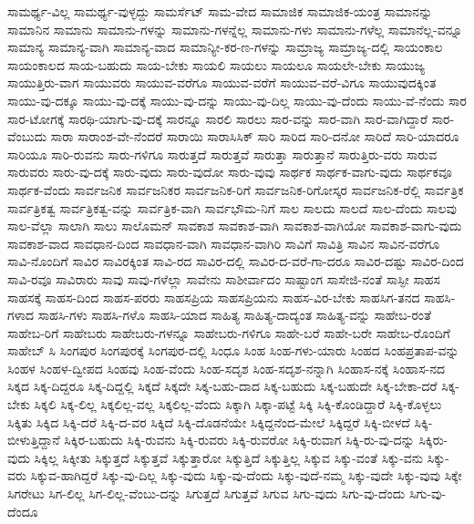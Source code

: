 {ಸಾಮರ್ಥ್ಯ-ವಿಲ್ಲ
ಸಾಮರ್ಥ್ಯ-ವುಳ್ಳದ್ದು
ಸಾಮರ್ಸೆಟ್
ಸಾಮ-ವೇದ
ಸಾಮಾಜಿಕ
ಸಾಮಾಜಿಕ-ಯಂತ್ರ
ಸಾಮಾನನ್ನು
ಸಾಮಾನಿನ
ಸಾಮಾನು
ಸಾಮಾನು-ಗಳನ್ನು
ಸಾಮಾನು-ಗಳನ್ನೆಲ್ಲ
ಸಾಮಾನು-ಗಳು
ಸಾಮಾನು-ಗಳೆಲ್ಲ
ಸಾಮಾನೆಲ್ಲ-ವನ್ನೂ
ಸಾಮಾನ್ಯ
ಸಾಮಾನ್ಯ-ವಾಗಿ
ಸಾಮಾನ್ಯ-ವಾದ
ಸಾಮಾನ್ಯೀ-ಕರ-ಣ-ಗಳನ್ನು
ಸಾಮ್ರಾಜ್ಯ
ಸಾಮ್ರಾಜ್ಯ-ದಲ್ಲಿ
ಸಾಯಂಕಾಲ
ಸಾಯಂಕಾಲದ
ಸಾಯ-ಬಹುದು
ಸಾಯ-ಬೇಕು
ಸಾಯಲಿ
ಸಾಯಲು
ಸಾಯಲೂ
ಸಾಯಲೇ-ಬೇಕು
ಸಾಯುಜ್ಯ
ಸಾಯುತ್ತಿರು-ವಾಗ
ಸಾಯುವರು
ಸಾಯುವ-ವರೆಗೂ
ಸಾಯುವ-ವರೆಗೆ
ಸಾಯುವ-ವರೆ-ವಿಗೂ
ಸಾಯುವುದಕ್ಕಿಂತ
ಸಾಯು-ವು-ದಕ್ಕೂ
ಸಾಯು-ವು-ದಕ್ಕೆ
ಸಾಯು-ವು-ದನ್ನು
ಸಾಯು-ವು-ದಿಲ್ಲ
ಸಾಯು-ವು-ದೆಂದು
ಸಾಯು-ವೆ-ನೆಂದು
ಸಾರ
ಸಾರ-ಟೋಗಕ್ಕೆ
ಸಾರಥಿ-ಯಾಗು-ವು-ದಕ್ಕೆ
ಸಾರನ್ನೂ
ಸಾರಲಿ
ಸಾರಲು
ಸಾರ-ವನ್ನು
ಸಾರ-ವಾಗಿ
ಸಾರ-ವಾಗಿದ್ದಾರೆ
ಸಾರ-ವೆಂಬುದು
ಸಾರಾ
ಸಾರಾಂಶ-ವೇ-ನೆಂದರೆ
ಸಾರಾಯಿ
ಸಾರಾಸಿಸಿಕ್
ಸಾರಿ
ಸಾರಿದ
ಸಾರಿ-ದನೋ
ಸಾರಿದೆ
ಸಾರಿ-ಯಾದರೂ
ಸಾರಿಯೂ
ಸಾರಿ-ರುವನು
ಸಾರು-ಗಳಿಗೂ
ಸಾರುತ್ತದೆ
ಸಾರುತ್ತವೆ
ಸಾರುತ್ತಾ
ಸಾರುತ್ತಾನೆ
ಸಾರುತ್ತಿರು-ವರು
ಸಾರುವ
ಸಾರುವರು
ಸಾರು-ವು-ದಕ್ಕೆ
ಸಾರು-ವುದು
ಸಾರು-ವುದೋ
ಸಾರು-ವುವು
ಸಾರ್ಥಕ
ಸಾರ್ಥಕ-ವಾಗು-ವುದು
ಸಾರ್ಥಕವೂ
ಸಾರ್ಥಕ-ವೆಂದು
ಸಾರ್ವಜನಿಕ
ಸಾರ್ವಜನಿಕರ
ಸಾರ್ವಜನಿಕ-ರಿಗೆ
ಸಾರ್ವಜನಿಕ-ರಿಗೋಸ್ಕರ
ಸಾರ್ವಜನಿಕ-ರೆಲ್ಲಿ
ಸಾರ್ವತ್ರಿಕ
ಸಾರ್ವತ್ರಿಕತ್ವ
ಸಾರ್ವತ್ರಿಕತ್ವ-ವನ್ನು
ಸಾರ್ವತ್ರಿಕ-ವಾಗಿ
ಸಾರ್ವಭೌಮ-ನಿಗೆ
ಸಾಲ
ಸಾಲದು
ಸಾಲದೆ
ಸಾಲ-ದೆಂದು
ಸಾಲವು
ಸಾಲ-ವೆಲ್ಲಾ
ಸಾಲಾಗಿ
ಸಾಲು
ಸಾಲೊಮನ್
ಸಾವಕಾಶ
ಸಾವಕಾಶ-ವಾಗಿ
ಸಾವಕಾಶ-ವಾಗಿಯೋ
ಸಾವಕಾಶ-ವಾಗು-ವುದು
ಸಾವಕಾಶ-ವಾದ
ಸಾವಧಾನ-ದಿಂದ
ಸಾವಧಾನ-ವಾಗಿ
ಸಾವಧಾನ-ವಾಗಿರಿ
ಸಾವಿಗೆ
ಸಾವಿತ್ರಿ
ಸಾವಿನ
ಸಾವಿನ-ವರೆಗೂ
ಸಾವಿ-ನೊಂದಿಗೆ
ಸಾವಿರ
ಸಾವಿರಕ್ಕಿಂತ
ಸಾವಿ-ರದ
ಸಾವಿರ-ದಲ್ಲಿ
ಸಾವಿರ-ದ-ವರೆ-ಗಾ-ದರೂ
ಸಾವಿರ-ದಷ್ಟು
ಸಾವಿರ-ದಿಂದ
ಸಾವಿ-ರವೂ
ಸಾವಿರಾರು
ಸಾವು
ಸಾವು-ಗಳೆಲ್ಲಾ
ಸಾವೇನು
ಸಾಶೀರ್ವಾದಂ
ಸಾಷ್ಟಾಂಗ
ಸಾಸೇಜಿ-ನಂತೆ
ಸಾಸ್ಫೀ
ಸಾಹಸ
ಸಾಹಸಕ್ಕೆ
ಸಾಹಸ-ದಿಂದ
ಸಾಹಸ-ಪರರು
ಸಾಹಸಪ್ರಿಯ
ಸಾಹಸಪ್ರಿಯನು
ಸಾಹಸ-ವಿರ-ಬೇಕು
ಸಾಹಸಿಗ-ತನದ
ಸಾಹಸಿ-ಗಳಾದ
ಸಾಹಸಿ-ಗಳು
ಸಾಹಸಿ-ಗಳೊ
ಸಾಹಸಿ-ಯಾದ
ಸಾಹಿತ್ಯ
ಸಾಹಿತ್ಯ-ದಾದ್ಯಂತ
ಸಾಹಿತ್ಯ-ವನ್ನು
ಸಾಹೇಬ-ರಂತೆ
ಸಾಹೇಬ-ರಿಗೆ
ಸಾಹೇಬರು
ಸಾಹೇಬರು-ಗಳನ್ನೂ
ಸಾಹೇಬರು-ಗಳಿಗೂ
ಸಾಹೇ-ಬರೆ
ಸಾಹೇ-ಬರೇ
ಸಾಹೇಬ-ರೊಂದಿಗೆ
ಸಾಹೇಬ್
ಸಿ
ಸಿಂಗಪುರ
ಸಿಂಗಪುರಕ್ಕೆ
ಸಿಂಗಪುರ-ದಲ್ಲಿ
ಸಿಂಧೂ
ಸಿಂಹ
ಸಿಂಹ-ಗಳು-ಯಾರು
ಸಿಂಹದ
ಸಿಂಹಪ್ರತಾಪ-ವನ್ನು
ಸಿಂಹಳ
ಸಿಂಹಳ-ದ್ವೀಪದ
ಸಿಂಹವು
ಸಿಂಹ-ವೆಂದು
ಸಿಂಹ-ಸದೃಶ
ಸಿಂಹ-ಸದೃಶ-ನನ್ನಾಗಿ
ಸಿಂಹಾಸ-ನಕ್ಕೆ
ಸಿಂಹಾಸ-ನದ
ಸಿಕ್ಕದ
ಸಿಕ್ಕ-ದಿದ್ದರೂ
ಸಿಕ್ಕ-ದಿದ್ದಲ್ಲಿ
ಸಿಕ್ಕದೆ
ಸಿಕ್ಕದೇ
ಸಿಕ್ಕ-ಬಹು-ದಾದ
ಸಿಕ್ಕ-ಬಹುದು
ಸಿಕ್ಕ-ಬಹುದೇ
ಸಿಕ್ಕ-ಬೇಕಾ-ದರೆ
ಸಿಕ್ಕ-ಬೇಕು
ಸಿಕ್ಕಲಿ
ಸಿಕ್ಕ-ಲಿಲ್ಲ
ಸಿಕ್ಕಲಿಲ್ಲ-ವಲ್ಲ
ಸಿಕ್ಕಲಿಲ್ಲ-ವೆಂದು
ಸಿಕ್ಕಾಗಿ
ಸಿಕ್ಕಾ-ಪಟ್ಟೆ
ಸಿಕ್ಕಿ
ಸಿಕ್ಕಿ-ಕೊಂಡಿದ್ದಾರೆ
ಸಿಕ್ಕಿ-ಕೊಳ್ಳಲು
ಸಿಕ್ಕಿತು
ಸಿಕ್ಕಿದ
ಸಿಕ್ಕಿ-ದರೆ
ಸಿಕ್ಕಿ-ದ-ವರ
ಸಿಕ್ಕಿದೆ
ಸಿಕ್ಕಿ-ದೊಡನೆಯೇ
ಸಿಕ್ಕಿದ್ದನೆಂದ-ಮೇಲೆ
ಸಿಕ್ಕಿದ್ದರೆ
ಸಿಕ್ಕಿ-ಬೀಳದೆ
ಸಿಕ್ಕಿ-ಬೀಳುತ್ತಿದ್ದಾನೆ
ಸಿಕ್ಕಿರ-ಬಹುದು
ಸಿಕ್ಕಿ-ರುವನು
ಸಿಕ್ಕಿ-ರುವರು
ಸಿಕ್ಕಿ-ರುವರೋ
ಸಿಕ್ಕಿ-ರುವಾಗ
ಸಿಕ್ಕಿ-ರು-ವು-ದನ್ನು
ಸಿಕ್ಕಿರು-ವುದು
ಸಿಕ್ಕಿಲ್ಲ
ಸಿಕ್ಕೀತು
ಸಿಕ್ಕುತ್ತದೆ
ಸಿಕ್ಕುತ್ತವೆ
ಸಿಕ್ಕುತ್ತಾರೋ
ಸಿಕ್ಕುತ್ತಿದೆ
ಸಿಕ್ಕುತ್ತಿಲ್ಲ
ಸಿಕ್ಕುವ
ಸಿಕ್ಕು-ವಂತೆ
ಸಿಕ್ಕು-ವನು
ಸಿಕ್ಕು-ವರು
ಸಿಕ್ಕುವ-ಹಾಗಿದ್ದರೆ
ಸಿಕ್ಕು-ವು-ದಿಲ್ಲ
ಸಿಕ್ಕು-ವುದು
ಸಿಕ್ಕು-ವು-ದೆಂದು
ಸಿಕ್ಕು-ವುದೆ-ನಮ್ಮ
ಸಿಕ್ಕು-ವುದೇ
ಸಿಕ್ಕು-ವುವು
ಸಿಕ್ಕೇ
ಸಿಗರೇಟು
ಸಿಗ-ಲಿಲ್ಲ
ಸಿಗ-ಲಿಲ್ಲ-ವೆಂಬು-ದನ್ನು
ಸಿಗುತ್ತದೆ
ಸಿಗುತ್ತವೆ
ಸಿಗುವ
ಸಿಗು-ವುದು
ಸಿಗು-ವು-ದೆಂದು
ಸಿಗು-ವು-ದೆಂದೂ
}
